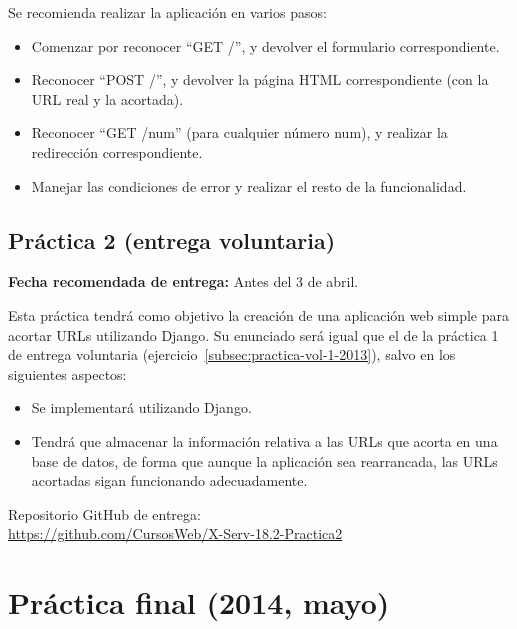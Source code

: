 Se recomienda realizar la aplicación en varios pasos:

\begin{itemize}
\item Comenzar por reconocer ``GET /'', y devolver el formulario correspondiente.
\item Reconocer ``POST /'', y devolver la página HTML correspondiente (con la URL real y la acortada).
\item Reconocer ``GET /num'' (para cualquier número num), y realizar la redirección correspondiente.
\item Manejar las condiciones de error y realizar el resto de la funcionalidad.
\end{itemize}

\subsection{Práctica 2 (entrega voluntaria)}
\label{subsec:practica-vol-2-2013}

\textbf{Fecha recomendada de entrega:} Antes del 3 de abril.

Esta práctica tendrá como objetivo la creación de una aplicación web simple para acortar URLs utilizando Django. Su enunciado será igual que el de la práctica 1 de entrega voluntaria (ejercicio~\ref{subsec:practica-vol-1-2013}), salvo en los siguientes aspectos:

\begin{itemize}
\item Se implementará utilizando Django.
\item Tendrá que almacenar la información relativa a las URLs que acorta en una base de datos, de forma que aunque la aplicación sea rearrancada, las URLs acortadas sigan funcionando adecuadamente.
\end{itemize}

Repositorio GitHub de entrega: \\
\url{https://github.com/CursosWeb/X-Serv-18.2-Practica2}

\newpage

\section{Práctica final (2014, mayo)}
\label{practica-final-2014-04}

